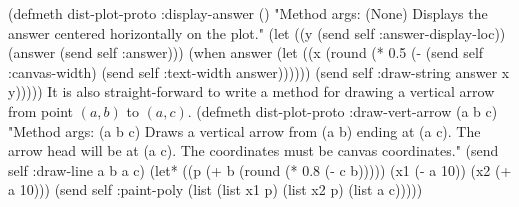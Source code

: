 (defmeth dist-plot-proto :display-answer ()
  "Method args: (None)
Displays the answer centered horizontally on the plot."
  (let ((y (send self :answer-display-loc))
        (answer (send self :answer)))
     (when answer
        (let ((x (round (* 0.5 (- (send self :canvas-width)
                                  (send self :text-width answer))))))
           (send self :draw-string answer x y)))))
\eatline
{}\nwendcode{}\nwdocspar
It is also straight-forward to write a method for drawing a vertical
arrow from point $(a,b)$ to $(a,c)$.
\nwenddocs{}\plusendmoddef
(defmeth dist-plot-proto :draw-vert-arrow (a b c)
  "Method args: (a b c)
Draws a vertical arrow from (a b) ending at (a c). The arrow head will
be at (a c). The coordinates must be canvas coordinates."
  (send self :draw-line a b a c)
  (let* ((p (+ b (round (* 0.8 (- c b)))))
         (x1 (- a 10))
         (x2 (+ a 10)))
    (send self :paint-poly (list (list x1 p) (list x2 p) (list a c)))))
\eatline
{}\nwendcode{}\nwdocspar

